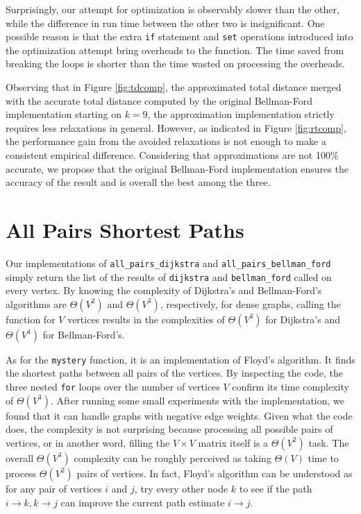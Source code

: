 \documentclass[titlepage, 12pt]{article}
\begin{document}
Surprisingly, our attempt for optimization is observably slower than the other,
while the difference in run time between the other two is insignificant. One
possible reason is that the extra \texttt{if} statement and \texttt{set}
operations introduced into the optimization attempt bring overheads to the
function. The time saved from breaking the loops is shorter than the time wasted
on processing the overheads.

Observing that in Figure \ref{fig:tdcomp}, the approximated total distance
merged with the accurate total distance computed by the original Bellman-Ford
implementation starting on \(k = 9\), the approximation implementation strictly
requires less relaxations in general. However, as indicated in Figure
\ref{fig:rtcomp}, the performance gain from the avoided relaxations is not
enough to make a consistent empirical difference. Considering that
approximations are not 100\% accurate, we propose that the original Bellman-Ford
implementation ensures the accuracy of the result and is overall the best among
the three.

\section{All Pairs Shortest Paths}

Our implementations of \texttt{all\_pairs\_dijkstra} and
\texttt{all\_pairs\_bellman\_ford} simply return the list of the results of
\texttt{dijkstra} and \texttt{bellman\_ford} called on every vertex. By knowing
the complexity of Dijkstra's and Bellman-Ford's algorithms are \(\Theta(V^2)\)
and \(\Theta(V^3)\), respectively, for dense graphs, calling the function for
\(V\) vertices results in the complexities of \(\Theta(V^3)\) for Dijkstra's and
\(\Theta(V^4)\) for Bellman-Ford's.

As for the \texttt{mystery} function, it is an implementation of Floyd's
algorithm. It finds the shortest paths between all pairs of the vertices. By
inspecting the code, the three nested \texttt{for} loops over the number of
vertices \(V\) confirm its time complexity of \(\Theta(V^3)\). After running
some small experiments with the implementation, we found that it can handle
graphs with negative edge weights. Given what the code does, the complexity is
not surprising because processing all possible pairs of vertices, or in another
word, filling the \(V \times V\) matrix itself is a \(\Theta(V^2)\) task. The
overall \(\Theta(V^3)\) complexity can be roughly perceived as taking
\(\Theta(V)\) time to process \(\Theta(V^2)\) pairs of vertices. In fact, Floyd's
algorithm can be understood as for any pair of vertices \(i\) and \(j\), try
every other node \(k\) to see if the path \(i \rightarrow k, k \rightarrow j\)
can improve the current path estimate \(i \rightarrow j\).
\end{document}
